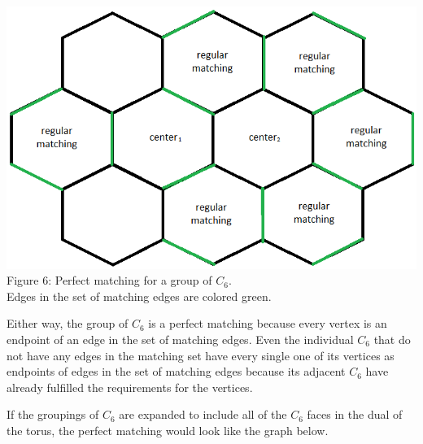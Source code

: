\documentclass[12pt]{article}
\begin{document}
\begin{flushleft}
\begin{center}
\includegraphics[scale=0.7]{images/c6groupmatching.png}\\
Figure 6: Perfect matching for a group of $C_6$.\\
Edges in the set of matching edges are colored green.
\end{center}

\medskip
Either way, the group of $C_6$ is a perfect matching because every vertex is an endpoint of an edge in the set of matching edges. Even the individual $C_6$ that do not have any edges in the matching set have every single one of its vertices as endpoints of edges in the set of matching edges because its adjacent $C_6$ have already fulfilled the requirements for the vertices.

\medskip
If the groupings of $C_6$ are expanded to include all of the $C_6$ faces in the dual of the torus, the perfect matching would look like the graph below.

\end{flushleft}
\end{document}

